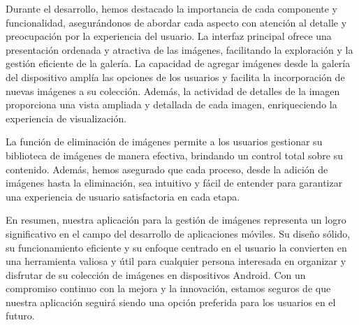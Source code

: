 \documentclass[conference]{IEEEtran}
\begin{document}
Durante el desarrollo, hemos destacado la importancia de cada componente y funcionalidad, asegurándonos de abordar cada aspecto con atención al detalle y preocupación por la experiencia del usuario. La interfaz principal ofrece una presentación ordenada y atractiva de las imágenes, facilitando la exploración y la gestión eficiente de la galería. La capacidad de agregar imágenes desde la galería del dispositivo amplía las opciones de los usuarios y facilita la incorporación de nuevas imágenes a su colección. Además, la actividad de detalles de la imagen proporciona una vista ampliada y detallada de cada imagen, enriqueciendo la experiencia de visualización.

La función de eliminación de imágenes permite a los usuarios gestionar su biblioteca de imágenes de manera efectiva, brindando un control total sobre su contenido. Además, hemos asegurado que cada proceso, desde la adición de imágenes hasta la eliminación, sea intuitivo y fácil de entender para garantizar una experiencia de usuario satisfactoria en cada etapa.

En resumen, nuestra aplicación para la gestión de imágenes representa un logro significativo en el campo del desarrollo de aplicaciones móviles. Su diseño sólido, su funcionamiento eficiente y su enfoque centrado en el usuario la convierten en una herramienta valiosa y útil para cualquier persona interesada en organizar y disfrutar de su colección de imágenes en dispositivos Android. Con un compromiso continuo con la mejora y la innovación, estamos seguros de que nuestra aplicación seguirá siendo una opción preferida para los usuarios en el futuro.
\end{document}
